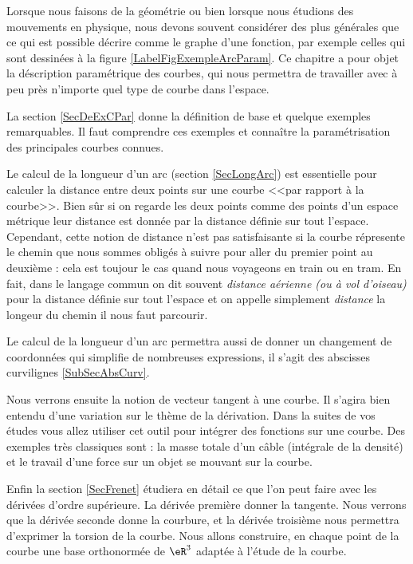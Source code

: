 Lorsque nous faisons de la géométrie ou bien lorsque nous étudions des mouvements en physique, nous devons souvent considérer des  plus générales que ce qui est possible décrire comme le graphe d'une fonction, par exemple celles qui sont dessinées à la figure \ref{LabelFigExempleArcParam}. Ce chapitre a pour objet la déscription paramétrique des courbes, qui nous permettra de travailler avec à peu près n'importe quel type de courbe dans l'espace.

La section \ref{SecDeExCPar} donne la définition de base et quelque exemples remarquables. Il faut comprendre ces exemples et conna\^{i}tre la paramétrisation des principales courbes connues.
 
Le calcul de la longueur d'un arc (section \ref{SecLongArc}) est essentielle pour calculer la distance entre deux points sur une courbe <<par rapport à la courbe>>. Bien sûr si on regarde les deux points comme des points d'un espace métrique leur distance est donnée par la distance définie sur tout l'espace. Cependant, cette notion de distance n'est pas satisfaisante si la courbe répresente le chemin que nous sommes obligés à suivre pour aller du premier point au deuxième : cela est toujour le cas quand nous voyageons en train ou en tram. En fait, dans le langage commun on dit souvent \emph{distance aérienne (ou à vol d'oiseau)} pour la distance définie sur tout l'espace et on appelle simplement \emph{distance} la longeur du chemin il nous faut parcourir. 

Le calcul de la longueur d'un arc permettra aussi de donner un changement de coordonnées qui simplifie de nombreuses expressions, il s'agit des abscisses curvilignes \ref{SubSecAbsCurv}.

Nous verrons ensuite la notion de vecteur tangent à une courbe. Il s'agira bien entendu d'une variation sur le thème de la dérivation. Dans la suites de vos études vous allez utiliser cet outil pour intégrer des fonctions sur une courbe. Des exemples très classiques sont : la masse totale d'un câble (intégrale de la densité) et  le travail d'une force sur un objet se mouvant sur la courbe.


Enfin la section \ref{SecFrenet} étudiera en détail ce que l'on peut faire avec les dérivées d'ordre supérieure. La dérivée première donner la tangente. Nous verrons que la dérivée seconde donne la courbure, et la dérivée troisième nous permettra d'exprimer la torsion de la courbe. Nous allons construire, en chaque point de la courbe une base orthonormée de $\eR^3$ adaptée à l'étude de la courbe.
